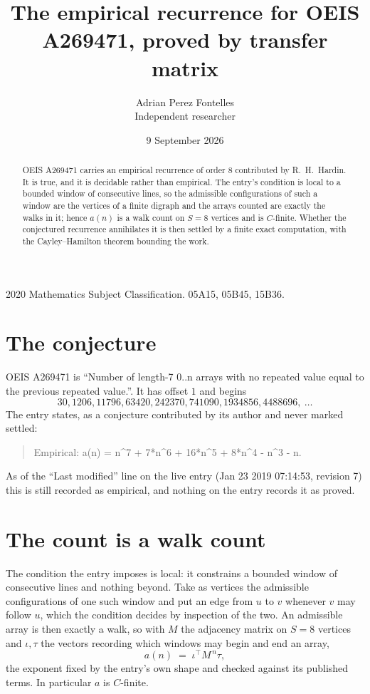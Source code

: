 \documentclass[11pt,a4paper]{article}
\title{The empirical recurrence for OEIS A269471, proved by transfer matrix}
\author{Adrian Perez Fontelles\\ \small Independent researcher}
\date{9 September 2026}
\theoremstyle{plain}
\theoremstyle{definition}
\begin{document}
\maketitle

\begin{abstract}
OEIS A269471 carries an empirical recurrence of order $8$ contributed by R.~H.~Hardin. It is
true, and it is decidable rather than empirical. The entry's condition is local to a bounded window of consecutive lines, so
the admissible configurations of such a window are the vertices of a finite digraph and the
arrays counted are exactly the walks in it; hence $a(n)$ is a walk count on $S=8$ vertices
and is $C$-finite. Whether the conjectured recurrence annihilates it is then settled by a
finite exact computation, with the Cayley--Hamilton theorem bounding the work.
\end{abstract}

\noindent\small 2020 Mathematics Subject Classification. 05A15, 05B45, 15B36.\normalsize

\section{The conjecture}

OEIS A269471 is ``Number of length-7 0..n arrays with no repeated value equal to the previous repeated value.''. It has offset $1$ and begins
\[
30, 1206, 11796, 63420, 242370, 741090, 1934856, 4488696,\ \dots
\]
The entry states, as a conjecture contributed by its author and never marked settled:
\begin{quote}
Empirical: a(n) = n\^{}7 + 7*n\^{}6 + 16*n\^{}5 + 8*n\^{}4 - n\^{}3 - n.
\end{quote}
As of the ``Last modified'' line on the live entry (Jan 23 2019 07:14:53, revision 7) this is still
recorded as empirical, and nothing on the entry records it as proved.

\section{The count is a walk count}

The condition the entry imposes is local: it constrains a bounded window of consecutive lines and nothing beyond. Take as
vertices the admissible configurations of one such window and put an edge from $u$ to $v$
whenever $v$ may follow $u$, which the condition decides by inspection of the two. An
admissible array is then exactly a walk, so with $M$ the adjacency matrix on $S=8$ vertices
and $\iota,\tau$ the vectors recording which windows may begin and end an array,
\[
a(n)\;=\;\iota^{\!\top}M^{\,n}\tau ,
\]
the exponent fixed by the entry's own shape and checked against its published terms. In
particular $a$ is $C$-finite.
\end{document}

